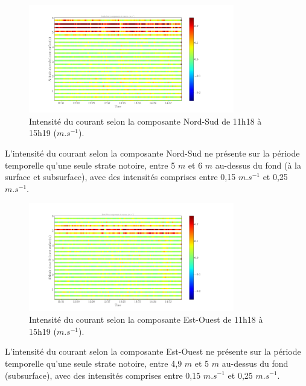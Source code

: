 \documentclass[12pt]{article}
\begin{document}
\begin{figure}[!ht]
	\begin{center}
		\includegraphics[width=0.8\textwidth]{180321021scatterv2.png}
		\caption{Intensité du courant selon la composante Nord-Sud de 11h18 à 15h19 ($m.s^{-1}$).}
	\end{center}
\end{figure}
L'intensité du courant selon la composante Nord-Sud ne présente sur la période temporelle qu'une seule strate notoire, entre 5 $m$ et 6 $m$ au-dessus du fond (à la surface et subsurface), avec des intensités comprises entre 0,15 $m.s^{-1}$ et 0,25 $m.s^{-1}$.\\

\begin{figure}[!ht]
	\begin{center}
		\includegraphics[width=0.8\textwidth]{180321021scatterv1.png}
		\caption{Intensité du courant selon la composante Est-Ouest de 11h18 à 15h19 ($m.s^{-1}$).}
	\end{center}
\end{figure}
L'intensité du courant selon la composante Est-Ouest ne présente sur la période temporelle qu'une seule strate notoire, entre 4,9 $m$ et 5 $m$ au-dessus du fond (subsurface), avec des intensités comprises entre 0,15 $m.s^{-1}$ et 0,25 $m.s^{-1}$.\\
\end{document}
